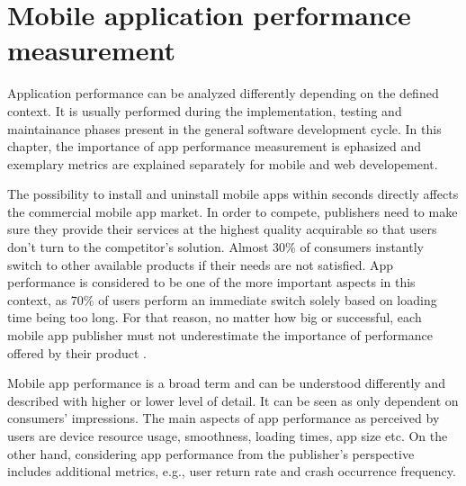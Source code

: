 
\chapter{Mobile application performance measurement}\label{chap:app_performance}

Application performance can be analyzed differently depending on the defined context. It is usually performed during the implementation, testing and maintainance phases present in the general software development cycle. In this chapter, the importance of app performance measurement is ephasized and exemplary metrics are explained separately for mobile and web developement.

The possibility to install and uninstall mobile apps within seconds directly affects the commercial mobile app market. In order to compete, publishers need to make sure they provide their services at the highest quality acquirable so that users don't turn to the competitor's solution. Almost 30\% of consumers instantly switch to other available products if their needs are not satisfied. App performance is considered to be one of the more important aspects in this context, as 70\% of users perform an immediate switch solely based on loading time being too long. For that reason, no matter how big or successful, each mobile app publisher must not underestimate the importance of performance offered by their product \cite{micro_moments_guide}. 

Mobile app performance is a broad term and can be understood differently and described with higher or lower level of detail. It can be seen as only dependent on consumers' impressions. The main aspects of app performance as perceived by users are device resource usage, smoothness, loading times, app size etc. On the other hand, considering app performance from the publisher's perspective includes additional metrics, e.g., user return rate and crash occurrence frequency.

